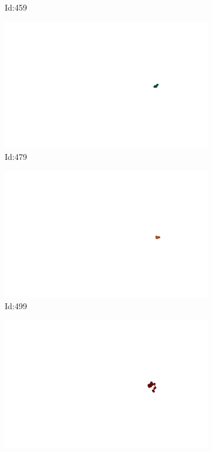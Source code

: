 \documentclass[12pt,twoside]{report}
\begin{document}
\begin{figure}
\begin{subfigure}[b]{0.20\textwidth}
\caption{Id:459}
\end{subfigure}
\begin{subfigure}[b]{0.20\textwidth}
\centering
\includegraphics[width=\textwidth]{../trajectories/479.png}
\caption{Id:479}
\end{subfigure}
\begin{subfigure}[b]{0.20\textwidth}
\centering
\includegraphics[width=\textwidth]{../trajectories/499.png}
\caption{Id:499}
\end{subfigure}
\begin{subfigure}[b]{0.20\textwidth}
\centering
\includegraphics[width=\textwidth]{../trajectories/512.png}

\end{subfigure}
\end{figure}
\end{document}
